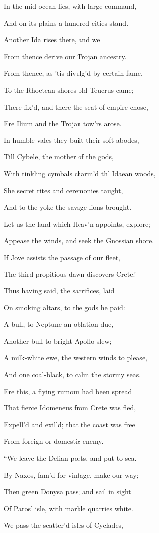 In the mid ocean lies, with large command,

And on its plains a hundred cities stand.

Another Ida rises there, and we

From thence derive our Trojan ancestry.

From thence, as ’tis divulg’d by certain fame,

To the Rhoetean shores old Teucrus came;

There fix’d, and there the seat of empire chose,

Ere Ilium and the Trojan tow’rs arose.

In humble vales they built their soft abodes,

Till Cybele, the mother of the gods,

With tinkling cymbals charm’d th’ Idaean woods,

She secret rites and ceremonies taught,

And to the yoke the savage lions brought.

Let us the land which Heav’n appoints, explore;

Appease the winds, and seek the Gnossian shore.

If Jove assists the passage of our fleet,

The third propitious dawn discovers Crete.’

Thus having said, the sacrifices, laid

On smoking altars, to the gods he paid:

A bull, to Neptune an oblation due,

Another bull to bright Apollo slew;

A milk-white ewe, the western winds to please,

And one coal-black, to calm the stormy seas.

Ere this, a flying rumour had been spread

That fierce Idomeneus from Crete was fled,

Expell’d and exil’d; that the coast was free

From foreign or domestic enemy.

“We leave the Delian ports, and put to sea.

By Naxos, fam’d for vintage, make our way;

Then green Donysa pass; and sail in sight

Of Paros’ isle, with marble quarries white.

We pass the scatter’d isles of Cyclades,

